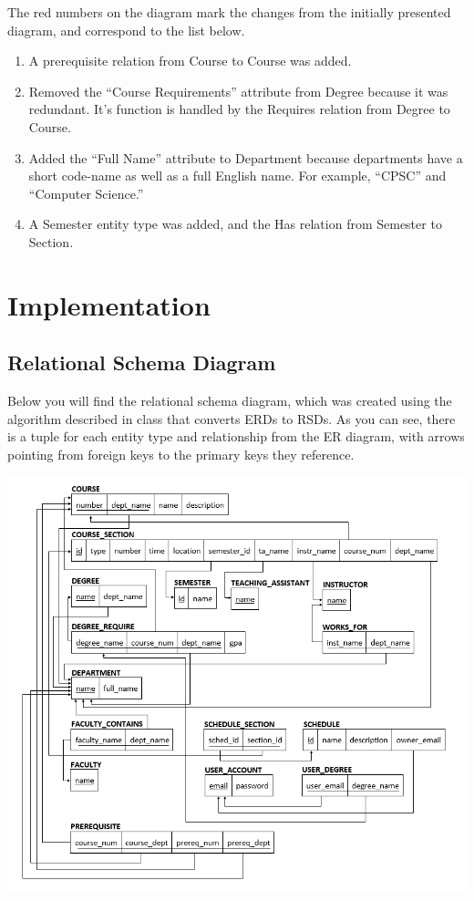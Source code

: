 \documentclass[twoside=false,a4paper,11pt]{article}
\theoremstyle{mytheor}
\begin{document}
The red numbers on the diagram mark the changes from the initially presented diagram, and correspond to the list below.

\begin{enumerate}
	\item A prerequisite relation from Course to Course was added.
	\item Removed the ``Course Requirements'' attribute from Degree because it was redundant. It's function is handled by the Requires relation from Degree to Course.
	\item Added the ``Full Name'' attribute to Department because departments have a short code-name as well as a full English name. For example, ``CPSC'' and ``Computer Science.''
	\item A Semester entity type was added, and the Has relation from Semester to Section.
\end{enumerate}

\section*{Implementation}

\subsection*{Relational Schema Diagram}

Below you will find the relational schema diagram, which was created using the algorithm described in class that converts ERDs to RSDs. As you can see, there is a tuple for each entity type and relationship from the ER diagram, with arrows pointing from foreign keys to the primary keys they reference.

\includegraphics[width=\textwidth]{RelationalSchemaDiagram.png}
\end{document}
